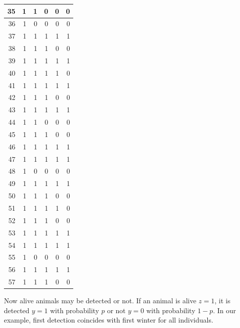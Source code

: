 \documentclass[
  12pt,
]{krantz}
\begin{document}
\begin{tabular}{r|r|r|r|r|r}
\hline
35 & 1 & 1 & 0 & 0 & 0\\
\hline
36 & 1 & 0 & 0 & 0 & 0\\
\hline
37 & 1 & 1 & 1 & 1 & 1\\
\hline
38 & 1 & 1 & 1 & 0 & 0\\
\hline
39 & 1 & 1 & 1 & 1 & 1\\
\hline
40 & 1 & 1 & 1 & 1 & 0\\
\hline
41 & 1 & 1 & 1 & 1 & 1\\
\hline
42 & 1 & 1 & 1 & 0 & 0\\
\hline
43 & 1 & 1 & 1 & 1 & 1\\
\hline
44 & 1 & 1 & 0 & 0 & 0\\
\hline
45 & 1 & 1 & 1 & 0 & 0\\
\hline
46 & 1 & 1 & 1 & 1 & 1\\
\hline
47 & 1 & 1 & 1 & 1 & 1\\
\hline
48 & 1 & 0 & 0 & 0 & 0\\
\hline
49 & 1 & 1 & 1 & 1 & 1\\
\hline
50 & 1 & 1 & 1 & 0 & 0\\
\hline
51 & 1 & 1 & 1 & 1 & 0\\
\hline
52 & 1 & 1 & 1 & 0 & 0\\
\hline
53 & 1 & 1 & 1 & 1 & 1\\
\hline
54 & 1 & 1 & 1 & 1 & 1\\
\hline
55 & 1 & 0 & 0 & 0 & 0\\
\hline
56 & 1 & 1 & 1 & 1 & 1\\
\hline
57 & 1 & 1 & 1 & 0 & 0\\
\hline
\end{tabular}

Now alive animals may be detected or not. If an animal is alive \(z = 1\), it is detected \(y = 1\) with probability \(p\) or not \(y = 0\) with probability \(1-p\). In our example, first detection coincides with first winter for all individuals.
\end{document}
